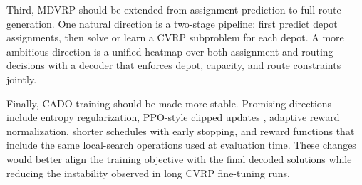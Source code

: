 Third, MDVRP should be extended from assignment prediction to full route generation. One natural direction is a two-stage pipeline: first predict depot assignments, then solve or learn a CVRP subproblem for each depot. A more ambitious direction is a unified heatmap over both assignment and routing decisions with a decoder that enforces depot, capacity, and route constraints jointly.

Finally, CADO training should be made more stable. Promising directions include entropy regularization, PPO-style clipped updates \citep{schulman2017proximal}, adaptive reward normalization, shorter schedules with early stopping, and reward functions that include the same local-search operations used at evaluation time. These changes would better align the training objective with the final decoded solutions while reducing the instability observed in long CVRP fine-tuning runs.
